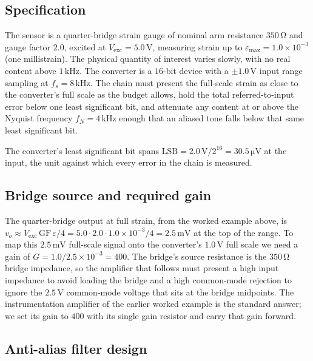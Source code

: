 

\subsection{Specification}

The sensor is a quarter-bridge strain gauge of nominal arm resistance
$350\,\si{\ohm}$ and gauge factor $2.0$, excited at $V_{\text{exc}} =
5.0\,\si{\volt}$, measuring strain up to $\varepsilon_{\max} =
1.0\times 10^{-3}$ (one millistrain). The physical quantity of interest
varies slowly, with no real content above $1\,\si{\kilo\hertz}$. The
converter is a $16$-bit device with a $\pm 1.0\,\si{\volt}$ input range
sampling at $f_s = 8\,\si{\kilo\hertz}$. The chain must present the
full-scale strain as close to the converter's full scale as the budget
allows, hold the total referred-to-input error below one least
significant bit, and attenuate any content at or above the Nyquist
frequency $f_N = 4\,\si{\kilo\hertz}$ enough that an aliased tone falls
below that same least significant bit.

The converter's least significant bit spans $\text{LSB} = 2.0\,\si{\volt}
/2^{16} = 30.5\,\si{\micro\volt}$ at the input, the unit against which
every error in the chain is measured.

\subsection{Bridge source and required gain}

The quarter-bridge output at full strain, from the worked example above,
is $v_o \approx V_{\text{exc}}\,\text{GF}\,\varepsilon/4 = 5.0\cdot 2.0
\cdot 1.0\times 10^{-3}/4 = 2.5\,\si{\milli\volt}$ at the top of the
range. To map this $2.5\,\si{\milli\volt}$ full-scale signal onto the
converter's $1.0\,\si{\volt}$ full scale we need a gain of $G =
1.0/2.5\times 10^{-3} = 400$. The bridge's source resistance is the
$350\,\si{\ohm}$ bridge impedance, so the amplifier that follows must
present a high input impedance to avoid loading the bridge and a high
common-mode rejection to ignore the $2.5\,\si{\volt}$ common-mode
voltage that sits at the bridge midpoints. The instrumentation amplifier
of the earlier worked example is the standard answer; we set its gain to
$400$ with its single gain resistor and carry that gain forward.

\subsection{Anti-alias filter design}

